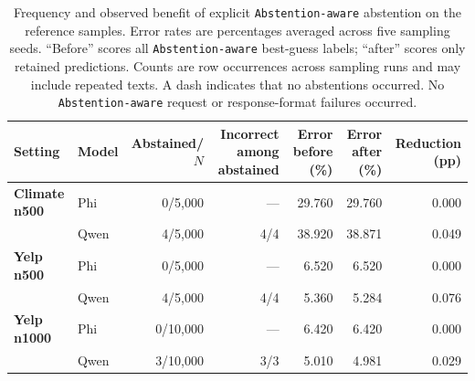 \begin{table}[t]
\centering
\footnotesize
\caption{Frequency and observed benefit of explicit \texttt{Abstention-aware} abstention on the reference samples. Error rates are percentages averaged across five sampling seeds. ``Before'' scores all \texttt{Abstention-aware} best-guess labels; ``after'' scores only retained predictions. Counts are row occurrences across sampling runs and may include repeated texts. A dash indicates that no abstentions occurred. No \texttt{Abstention-aware} request or response-format failures occurred.}
\label{tab:rq3-abstention}
\setlength{\tabcolsep}{5pt}
\begin{tabular}{llrrrrr}
\toprule
\textbf{Setting} & \textbf{Model} & \textbf{Abstained/$N$} & \textbf{Incorrect among abstained} & \textbf{Error before (\%)} & \textbf{Error after (\%)} & \textbf{Reduction (pp)} \\
\midrule
\textbf{Climate n500} & Phi & 0/5,000 & --- & 29.760 & 29.760 & 0.000 \\
 & Qwen & 4/5,000 & 4/4 & 38.920 & 38.871 & 0.049 \\
\midrule
\textbf{Yelp n500} & Phi & 0/5,000 & --- & 6.520 & 6.520 & 0.000 \\
 & Qwen & 4/5,000 & 4/4 & 5.360 & 5.284 & 0.076 \\
\midrule
\textbf{Yelp n1000} & Phi & 0/10,000 & --- & 6.420 & 6.420 & 0.000 \\
 & Qwen & 3/10,000 & 3/3 & 5.010 & 4.981 & 0.029 \\
\bottomrule
\end{tabular}
\end{table}
